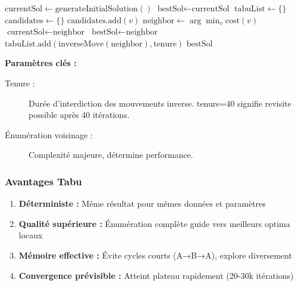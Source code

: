 \documentclass[12pt,a4paper,twoside]{report}
\begin{document}
\begin{algorithm}[H]
    \caption{Tabu Search pour VRPTW}
    \begin{algorithmic}
        \State $\text{currentSol} \gets \text{generateInitialSolution}()$
        \State $\text{bestSol} \gets \text{currentSol}$
        \State $\text{tabuList} \gets \{\}$ 
        \State $\text{candidates} \gets \{\}$
        \State $\text{candidates}.\text{add}(v)$
        \EndIf
        \EndFor
        \State $\text{neighbor} \gets \arg\min_v \text{cost}(v)$ 
        \State $\text{currentSol} \gets \text{neighbor}$
        \State $\text{bestSol} \gets \text{neighbor}$
        \EndIf
        \State $\text{tabuList}.\text{add}(\text{inverseMove}(\text{neighbor}), \text{tenure})$
        \State {}
        \EndFor
        \State \Return $\text{bestSol}$
    \end{algorithmic}
\end{algorithm}

\textbf{Paramètres clés :}

\begin{description}
    \item[Tenure :] Durée d'interdiction des mouvements inverse. tenure=40 signifie
          revisite possible après 40 itérations.

    \item[Énumération voisinage :] Complexité majeure, détermine performance.
\end{description}

\subsubsection{Avantages Tabu}

\begin{enumerate}
    \item \textbf{Déterministe :} Même résultat pour mêmes données et paramètres
    \item \textbf{Qualité supérieure :} Énumération complète guide vers meilleurs optima locaux
    \item \textbf{Mémoire effective :} Évite cycles courts (A→B→A), explore diversement
    \item \textbf{Convergence prévisible :} Atteint plateau rapidement (20-30k itérations)
\end{enumerate}
\end{document}
